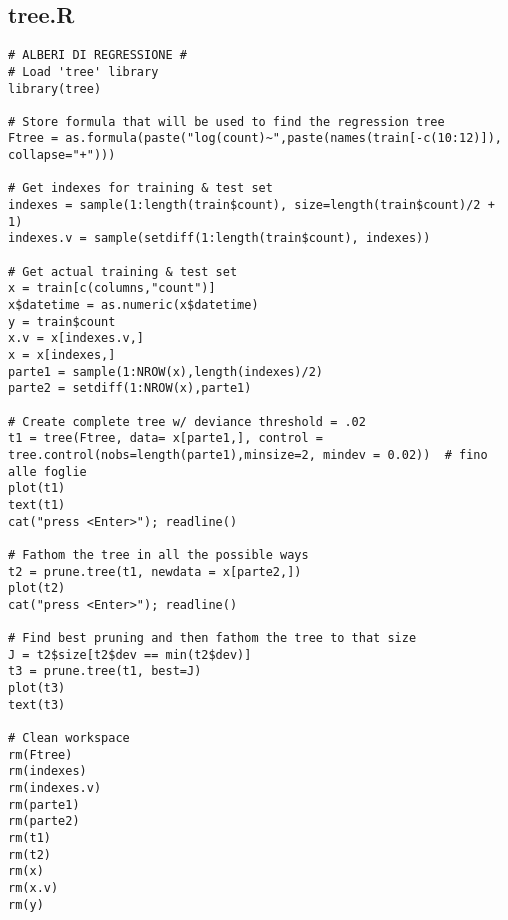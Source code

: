 \subsection{tree.R}\label{sec:tree-script}
\begin{verbatim}
# ALBERI DI REGRESSIONE #
# Load 'tree' library
library(tree)

# Store formula that will be used to find the regression tree
Ftree = as.formula(paste("log(count)~",paste(names(train[-c(10:12)]), collapse="+")))

# Get indexes for training & test set
indexes = sample(1:length(train$count), size=length(train$count)/2 + 1)
indexes.v = sample(setdiff(1:length(train$count), indexes))

# Get actual training & test set
x = train[c(columns,"count")]
x$datetime = as.numeric(x$datetime)
y = train$count
x.v = x[indexes.v,]
x = x[indexes,]
parte1 = sample(1:NROW(x),length(indexes)/2)
parte2 = setdiff(1:NROW(x),parte1)

# Create complete tree w/ deviance threshold = .02
t1 = tree(Ftree, data= x[parte1,], control = tree.control(nobs=length(parte1),minsize=2, mindev = 0.02))  # fino alle foglie
plot(t1)
text(t1)
cat("press <Enter>"); readline()

# Fathom the tree in all the possible ways
t2 = prune.tree(t1, newdata = x[parte2,])
plot(t2)
cat("press <Enter>"); readline()

# Find best pruning and then fathom the tree to that size
J = t2$size[t2$dev == min(t2$dev)]
t3 = prune.tree(t1, best=J)
plot(t3)
text(t3)

# Clean workspace
rm(Ftree)
rm(indexes)
rm(indexes.v)
rm(parte1)
rm(parte2)
rm(t1)
rm(t2)
rm(x)
rm(x.v)
rm(y)
\end{verbatim}

